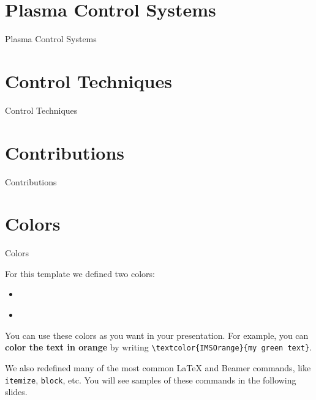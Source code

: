 \documentclass[usenames,dvipsnames,10pt,aspectratio=169]{beamer}
\begin{document}
\section{Plasma Control Systems}
\begin{frame}{Plasma Control Systems}

\end{frame}

\section{Control Techniques}
\begin{frame}{Control Techniques}
    
\end{frame}



\section{Contributions}
\begin{frame}{Contributions}
    
\end{frame}



\section{Colors}

\begin{frame}{Colors}

For this template we defined two colors:
\begin{itemize}
\item \textcolor{white}{}
\item \textcolor{white}{}
\end{itemize}

\vskip 0.5cm

You can use these colors as you want in your presentation. For example, you can \textbf{\textcolor{IMSOrange}{color the text in orange}} by writing \texttt{\textbackslash textcolor\{IMSOrange\}\{my green text\}}.

\vskip 0.5cm

We also redefined many of the most common \LaTeX{} and Beamer commands, like \texttt{itemize}, \texttt{block}, etc. You will see samples of these commands in the following slides.

\end{frame}
\end{document}
